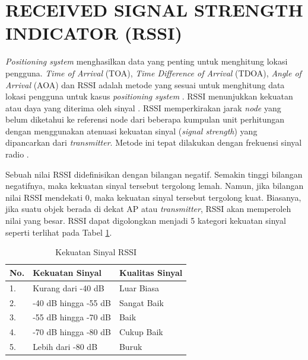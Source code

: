 \section{\uppercase{RECEIVED SIGNAL STRENGTH INDICATOR (RSSI)}}
\textit{Positioning system} menghasilkan data yang penting untuk menghitung lokasi pengguna. \textit{Time of Arrival} (TOA), \textit{Time Difference of Arrival} (TDOA), \textit{Angle of Arrival} (AOA) dan RSSI adalah metode yang sesuai untuk menghitung data lokasi pengguna untuk kasus \textit{positioning system} \citep{Liu2007}. RSSI menunjukkan kekuatan atau daya yang diterima oleh sinyal \citep{Kajioka2014}. RSSI memperkirakan jarak \textit{node} yang belum diketahui ke referensi node dari beberapa kumpulan unit perhitungan dengan menggunakan atenuasi kekuatan sinyal (\textit{signal strength}) yang dipancarkan dari \textit{transmitter}. Metode ini tepat dilakukan dengan frekuensi sinyal radio \citep{Schneegans2007}.

\par Sebuah nilai RSSI didefinisikan dengan bilangan negatif. Semakin tinggi bilangan negatifnya, maka kekuatan sinyal tersebut tergolong lemah. Namun, jika bilangan nilai RSSI mendekati 0, maka kekuatan sinyal tersebut tergolong kuat. Biasanya, jika suatu objek berada di dekat AP atau \textit{transmitter}, RSSI akan memperoleh nilai yang besar. RSSI dapat digolongkan menjadi 5 kategori kekuatan sinyal seperti terlihat pada Tabel \ref{t_rssi}.

\begin{table}[H]
\centering
\caption{Kekuatan Sinyal RSSI \citep{VerisIndustries2013}}
\label{t_rssi}
\begin{tabular}{|l|l|l|} 
\hline
\textbf{No.} & \textbf{Kekuatan Sinyal} & \textbf{Kualitas Sinyal}  \\ 
\hline
1.           & Kurang dari -40 dB       & Luar Biasa              \\ 
\hline
2.           & -40 dB hingga -55 dB     & Sangat Baik               \\ 
\hline
3.           & -55 dB hingga -70 dB     & Baik                      \\ 
\hline
4.           & -70 dB hingga -80 dB     & Cukup Baik                \\ 
\hline
5.           & Lebih dari -80 dB        & Buruk                     \\
\hline
\end{tabular}
\end{table}

